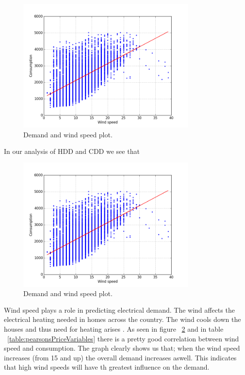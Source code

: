 \begin{figure}[H]
\centering
\includegraphics[width=0.8\textwidth ,natwidth=410,natheight=237]{billeder/energy_price_plots/consump_wind.png}
\caption{Demand and wind speed plot.}
\label{fig:consump_wind}
\end{figure}

In our analysis of HDD and CDD we see that 

\begin{figure}[H]
\centering
\includegraphics[width=0.8\textwidth ,natwidth=410,natheight=237]{billeder/energy_price_plots/consump_wind.png}
\caption{Demand and wind speed plot.}
\label{fig:consump_wind}
\end{figure}

Wind speed plays a role in predicting electrical demand. The wind affects the electrical heating needed in homes across the country. The wind cools down the houses and thus need for heating arises \cite{19}. As seen in figure ~\ref{fig:consump_wind} and in table ~\ref{table:pearsonsPriceVariables} there is a pretty good correlation between wind speed and consumption. The graph clearly shows us that; when the wind speed increases (from 15 and up) the overall demand increases aswell. This indicates that high wind speeds will have th greatest influence on the demand.
